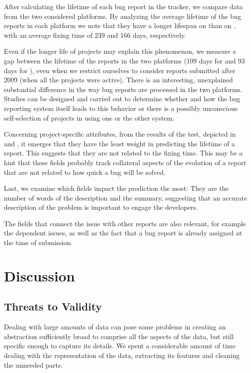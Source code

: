 After calculating the lifetime of each bug report in the tracker, we compare data from the two considered platforms.
By analyzing the average lifetime of the bug reports in each platform we note that they have a longer lifespan on \bzilla than on \jira, with an average fixing time of 239 and 166 days, respectively.

Even if the longer life of \bzilla projects may explain this phenomenon, we measure a gap between the lifetime of the reports in the two platforms (109 days for \bzilla and 93 days for \jira), even when we restrict ourselves to consider reports submitted after 2009 (\ie when all the projects were active).
There is an interesting, unexplained substantial difference in the way bug reports are processed in the two platforms.
Studies can be designed and carried out to determine whether and how the bug reporting system itself leads to this behavior or there is a possibly unconscious self-selection of projects in using one or the other system.

Concerning project-specific attributes, from the results of the test, depicted in  and , it emerges that they have the least weight in predicting the lifetime of a report.
This suggests that they are not related to the fixing time.
This may be a hint that these fields probably track collateral aspects of the evolution of a report that are not related to how quick a bug will be solved.

Last, we examine which fields impact the prediction the most: They are the number of words of the description and the summary, suggesting that an accurate description of the problem is important to engage the developers.

The fields that connect the issue with other reports are also relevant, for example the dependent issues, as well as the fact that a bug report is already assigned at the time of submission.



\section{Discussion} \label{sec:model-discussion}

\subsection{Threats to Validity}

Dealing with large amounts of data can pose some problems in creating an abstraction sufficiently broad to comprise all the aspects of the data, but still specific enough to capture its details.
We spent a considerable amount of time dealing with the representation of the data, extracting its features and cleaning the unneeded parts.


